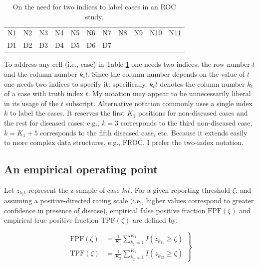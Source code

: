 \documentclass[
]{book}
\begin{document}
\begin{table}

\caption{\label{tab:empirical-ROC-2index-notation}On the need for two indices to label cases in an ROC study.}
\centering
\begin{tabular}[t]{l|l|l|l|l|l|l|l|l|l|l}
\hline
 &  &  &  &  &  &  &  &  &  & \\
\hline
N1 & N2 & N3 & N4 & N5 & N6 & N7 & N8 & N9 & N10 & N11\\
\hline
D1 & D2 & D3 & D4 & D5 & D6 & D7 &  &  &  & \\
\hline
\end{tabular}
\end{table}

To address any cell (i.e., case) in Table \ref{tab:empirical-ROC-2index-notation} one needs two indices: the row number \(t\) and the column number \(k_tt\). Since the column number depends on the value of \(t\) one needs two indices to specify it: specifically, \(k_tt\) denotes the column number \(k_t\) of a case with truth index \(t\). My notation may appear to be unnecessarily liberal in its usage of the \(t\) subscript. Alternative notation commonly uses a single index \(k\) to label the cases. It reserves the first \(K_1\) positions for non-diseased cases and the rest for diseased cases: e.g., \(k = 3\) corresponds to the third non-diseased case, \(k = K_1+5\) corresponds to the fifth diseased case, etc. Because it extends easily to more complex data structures, e.g., FROC, I prefer the two-index notation.

\hypertarget{an-empirical-operating-point}{%
\subsection{An empirical operating point}\label{an-empirical-operating-point}}

Let \(z_{k_tt}\) represent the z-sample of case \(k_tt\). For a given reporting threshold \(\zeta\), and assuming a positive-directed rating scale (i.e., higher values correspond to greater confidence in presence of disease), empirical false positive fraction \(\text{FPF}(\zeta)\) and empirical true positive fraction \(\text{TPF}(\zeta)\) are defined by:

\begin{equation}
\left.
\begin{aligned}
\text{FPF}\left ( \zeta \right ) &= \frac{1}{K_1}\sum_{k_1=1}^{K_1}I\left ( z_{k_11} \geq \zeta \right ) \\
\text{TPF}\left ( \zeta \right ) &= \frac{1}{K_2}\sum_{k_2=1}^{K_2}I\left ( z_{k_22} \geq \zeta \right )
\end{aligned}
\right \}
\label{eq:empirical-auc-op-pt}
\end{equation}
\end{document}
